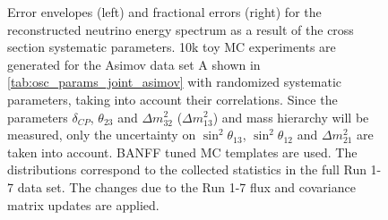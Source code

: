 \begin{figure}[htb]
\caption {
Error envelopes (left) and fractional errors (right) for the reconstructed neutrino energy spectrum
as a result of the cross section systematic parameters. 
10k toy MC experiments are generated for the Asimov data set A shown in \cref{tab:osc_params_joint_asimov}
with randomized systematic parameters, taking into account their correlations.
Since the parameters $\delta_{CP}$, $\theta_{23}$ and $\Delta m^2_{32}$ ($\Delta m^2_{13}$) and mass hierarchy
will be measured,
only the uncertainty on 
$\sin^2 \theta_{13}$,
$\sin^2 \theta_{12}$
and 
$\Delta m^2_{21}$ 
are taken into account.
BANFF tuned MC templates are used. 
The distributions correspond to the collected statistics in the full Run 1-7 data set.
The changes due to the Run 1-7 flux and covariance matrix updates are applied.
}
\label{fig:xsec_envelope_Asimov_A_run17}
\end{figure}


